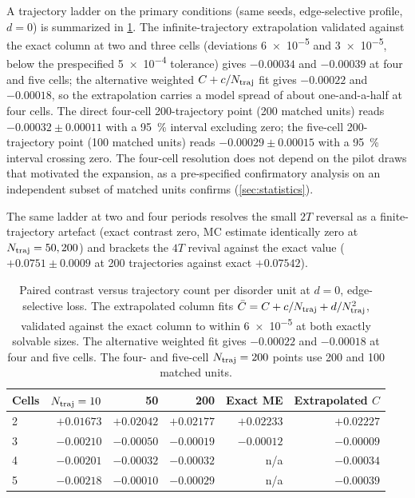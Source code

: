 \documentclass[aps,pra,preprint,superscriptaddress,amsmath,amssymb]{revtex4-2}
\begin{document}
A trajectory ladder on the primary conditions (same seeds, edge-selective profile, $d=\num{0}$) is summarized in \cref{tab:trajladder}. The infinite-trajectory extrapolation validated against the exact column at two and three cells (deviations \num{6e-5} and \num{3e-5}, below the prespecified \num{5e-4} tolerance) gives $-\num{0.00034}$ and $-\num{0.00039}$ at four and five cells; the alternative weighted $C+c/N_{\rm traj}$ fit gives $-\num{0.00022}$ and $-\num{0.00018}$, so the extrapolation carries a model spread of about one-and-a-half at four cells. The direct four-cell \num{200}-trajectory point (\num{200} matched units) reads $-\num{0.00032}\pm\num{0.00011}$ with a \qty{95}{\percent} interval excluding zero; the five-cell \num{200}-trajectory point (\num{100} matched units) reads $-\num{0.00029}\pm\num{0.00015}$ with a \qty{95}{\percent} interval crossing zero. The four-cell resolution does not depend on the pilot draws that motivated the expansion, as a pre-specified confirmatory analysis on an independent subset of matched units confirms (\cref{sec:statistics}).

The same ladder at two and four periods resolves the small $2T$ reversal as a finite-trajectory artefact (exact contrast zero, MC estimate identically zero at $N_{\rm traj}=\num{50},\num{200}$) and brackets the $4T$ revival against the exact value ($+\num{0.0751}\pm\num{0.0009}$ at \num{200} trajectories against exact $+\num{0.07542}$).

\begin{table}[h]
\caption{Paired contrast versus trajectory count per disorder unit at $d=\num{0}$, edge-selective loss. The extrapolated column fits $\bar{C}=C+c/N_{\rm traj}+d/N_{\rm traj}^{2}$, validated against the exact column to within \num{6e-5} at both exactly solvable sizes. The alternative weighted fit gives $-\num{0.00022}$ and $-\num{0.00018}$ at four and five cells. The four- and five-cell $N_{\rm traj}=\num{200}$ points use \num{200} and \num{100} matched units.}
\label{tab:trajladder}
\begin{ruledtabular}
\begin{tabular}{lrrrrr}
Cells & $N_{\rm traj}=\num{10}$ & \num{50} & \num{200} & Exact ME & Extrapolated $C$ \\
\hline
\num{2}  & $+\num{0.01673}$ & $+\num{0.02042}$ & $+\num{0.02177}$ & $+\num{0.02233}$ & $+\num{0.02227}$ \\
\num{3}  & $-\num{0.00210}$ & $-\num{0.00050}$ & $-\num{0.00019}$ & $-\num{0.00012}$ & $-\num{0.00009}$ \\
\num{4}  & $-\num{0.00201}$ & $-\num{0.00032}$ & $-\num{0.00032}$ & n/a & $-\num{0.00034}$ \\
\num{5}  & $-\num{0.00218}$ & $-\num{0.00010}$ & $-\num{0.00029}$ & n/a & $-\num{0.00039}$ \\
\end{tabular}
\end{ruledtabular}
\end{table}
\end{document}
